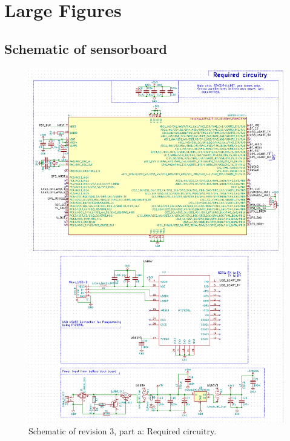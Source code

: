 \section{Large Figures}\label{sec:app}

\subsection{Schematic of sensorboard}\label{app:schemmain}
\begin{figure}[h]
	\centering
    \includegraphics[width=.93\linewidth]{Figures/schem_r3_a.png}
	\caption{Schematic of revision 3, part a: Required circuitry.}
	\label{fig:schr3a}
\end{figure}
